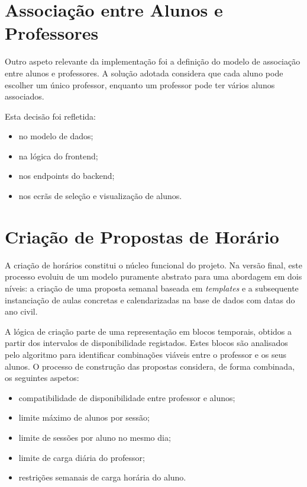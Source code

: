 \section{Associação entre Alunos e Professores}

Outro aspeto relevante da implementação foi a definição do modelo de associação entre alunos e professores.
A solução adotada considera que cada aluno pode escolher um único professor, enquanto um professor pode ter vários alunos associados.

Esta decisão foi refletida:

\begin{itemize}
    \item no modelo de dados;
    \item na lógica do frontend;
    \item nos endpoints do backend;
    \item nos ecrãs de seleção e visualização de alunos.
\end{itemize}

\section{Criação de Propostas de Horário}

A criação de horários constitui o núcleo funcional do projeto. Na versão final, este processo evoluiu de um modelo puramente abstrato para uma abordagem em dois níveis: a criação de uma proposta semanal baseada em \textit{templates} e a subsequente instanciação de aulas concretas e calendarizadas na base de dados com datas do ano civil.

A lógica de criação parte de uma representação em blocos temporais, obtidos a partir dos intervalos de disponibilidade registados. Estes blocos são analisados pelo algoritmo para identificar combinações viáveis entre o professor e os seus alunos. O processo de construção das propostas considera, de forma combinada, os seguintes aspetos:

\begin{itemize}
    \item compatibilidade de disponibilidade entre professor e alunos;
    \item limite máximo de alunos por sessão;
    \item limite de sessões por aluno no mesmo dia;
    \item limite de carga diária do professor;
    \item restrições semanais de carga horária do aluno.
\end{itemize}

